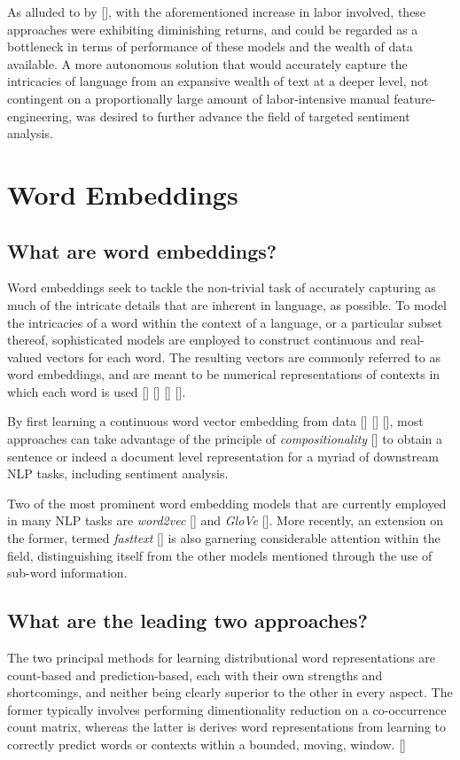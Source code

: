 \documentclass[12pt, a4paper]{report}
\theoremstyle{definition}
\theoremstyle{definition}%
\theoremstyle{definition}%
\theoremstyle{definition}%
\theoremstyle{definition}%
\theoremstyle{definition}%
\renewcommand{\cite}[1]{[\citealp{#1}]}
\begin{document}
As alluded to by \cite{zheng2018}, with the aforementioned increase in labor involved, these approaches were exhibiting diminishing returns, and could be regarded as a bottleneck in terms of performance of these models and the wealth of data available. A more autonomous solution that would accurately capture the intricacies of language from an expansive wealth of text at a deeper level, not contingent on a proportionally large amount of labor-intensive manual feature-engineering, was desired to further advance the field of targeted sentiment analysis.

\section{Word Embeddings}
\subsection{What are word embeddings?}
Word embeddings seek to tackle the non-trivial task of accurately capturing as much of the intricate details that are inherent in language, as possible. To model the intricacies of a word within the context of a language, or a particular subset thereof, sophisticated models are employed to construct continuous and real-valued vectors for each word. The resulting vectors are commonly referred to as word embeddings, and are meant to be numerical representations of contexts in which each word is used  \cite{bengio2003} \cite{mikolov2013} \cite{pennington} \cite{tang}.

By first learning a continuous word vector embedding from data \cite{bengio2003} \cite{mikolov2013} \cite{pennington}, most approaches can take advantage of the principle of \textit{compositionality} \cite{frege1892} to obtain a sentence or indeed a document level representation for a myriad of downstream NLP tasks, including sentiment analysis.

Two of the most prominent word embedding models that are currently employed in many NLP tasks are \textit{word2vec} \cite{mikolov2013} and \textit{GloVe} \cite{pennington}. More recently, an extension on the former, termed \textit{fasttext} \cite{bojanowski2017} is also garnering considerable attention within the field, distinguishing itself from the other models mentioned through the use of sub-word information.

\subsection{What are the leading two approaches?}
The two principal methods for learning distributional word representations are count-based and prediction-based, each with their own strengths and shortcomings, and neither being clearly superior to the other in every aspect. The former typically involves performing dimentionality reduction on a co-occurrence count matrix, whereas the latter is derives word representations from learning to correctly predict words or contexts within a bounded, moving, window. \cite{pennington}
\end{document}
